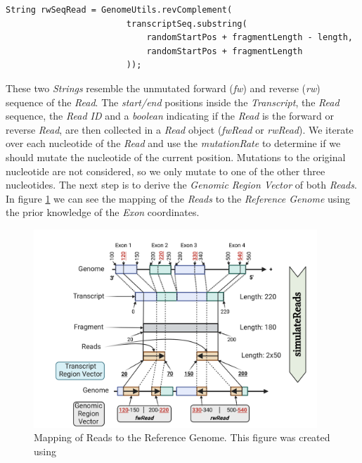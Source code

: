 \documentclass[12pt]{article}
\begin{document}
\begin{enumerate}
\begin{verbatim}
String rwSeqRead = GenomeUtils.revComplement(
                        transcriptSeq.substring(
                            randomStartPos + fragmentLength - length, 
                            randomStartPos + fragmentLength
                        ));
       \end{verbatim}
		These two \textit{Strings} resemble the unmutated forward (\textit{fw}) and reverse (\textit{rw}) sequence of the \textit{Read}.
		The \textit{start/end} positions inside the \textit{Transcript}, the \textit{Read} sequence, the \textit{Read ID} and a \textit{boolean} indicating if the \textit{Read}
		is the forward or reverse \textit{Read}, are then collected in a \textit{Read} object (\textit{fwRead} or \textit{rwRead}).
		We iterate over each nucleotide of the \textit{Read} and use the \textit{mutationRate} to determine if we should mutate the nucleotide of the
		current position.
		Mutations to the original nucleotide are not considered, so we only mutate to one of the other three nucleotides.
		The next step is to derive the \textit{Genomic Region Vector} of both \textit{Reads}.
		In figure \ref{fig:mapping} we can see the mapping of the \textit{Reads} to the \textit{Reference Genome} using the prior knowledge of the \textit{Exon} coordinates.

		\begin{figure}[htpb]
			\centering
			\includegraphics[width=0.95\textwidth]{"./figures/Map.png"}
			\caption{Mapping of Reads to the Reference Genome. This figure was created using \cite{biorender}}
			\label{fig:mapping}
		\end{figure}


\end{enumerate}
\end{document}
